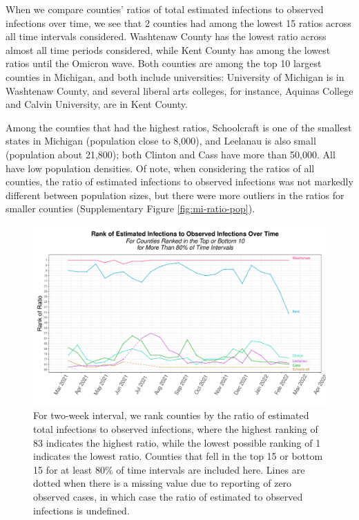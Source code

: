 \documentclass[12pt,twoside]{smiththesis}
\begin{document}
When we compare counties' ratios of total estimated infections to observed infections over time, we see that 2 counties had among the lowest 15 ratios across all time intervals considered. Washtenaw County has the lowest ratio across almost all time periods considered, while Kent County has among the lowest ratios until the Omicron wave. Both counties are among the top 10 largest counties in Michigan, and both include universities: University of Michigan is in Washtenaw County, and several liberal arts colleges, for instance, Aquinas College and Calvin University, are in Kent County.

Among the counties that had the highest ratios, Schoolcraft is one of the smallest states in Michigan (population close to 8,000), and Leelanau is also small (population about 21,800); both Clinton and Cass have more than 50,000. All have low population densities. Of note, when considering the ratios of all counties, the ratio of estimated infections to observed infections was not markedly different between population sizes, but there were more outliers in the ratios for smaller counties (Supplementary Figure \ref{fig:mi-ratio-pop}).
\begin{figure}
\includegraphics[width=1\linewidth]{figure/rank-ratio-over-time-mi-county} \caption{\label{fig:rank-ratio-over-time-mi-county}For two-week interval, we rank counties by the ratio of estimated total infections to observed infections, where the highest ranking of 83 indicates the highest ratio, while the lowest possible ranking of 1 indicates the lowest ratio. Counties that fell in the top 15 or bottom 15 for at least 80\% of time intervals are included here. Lines are dotted when there is a missing value due to reporting of zero observed cases, in which case the ratio of estimated to observed infections is undefined.}\label{fig:unnamed-chunk-85}
\end{figure}
\newpage
\end{document}
